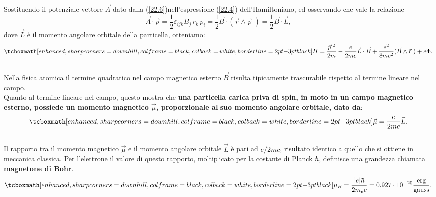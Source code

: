 Sostituendo il potenziale vettore $\vec{A}$ dato dalla (\ref{22.6})nell'espressione (\ref{22.4}) dell'Hamiltoniano, ed osservando che vale la relazione
\begin{equation}
\vec{A}\cdot\vec{p}=\frac{1}{2}\varepsilon_{ijk}B_{j}\, r_{k}\, p_{i}=\frac{1}{2}\vec{B}\cdot(\vec{r}\wedge\vec{p}\;)=\frac{1}{2}\vec{B}\cdot\vec{L} ,
\end{equation}
dove $\vec{L}$ è il momento angolare orbitale della particella, otteniamo:
	\begin{equation}
		\tcboxmath[enhanced, sharp corners=downhill, colframe=black, colback=white, borderline={2pt}{-3pt}{black}]{
			H=\frac{\vec{p}^{\;2}}{2m}-\frac{e}{2mc}\vec{L}\cdot\vec{B}+\frac{e^{2}}{8mc^{2}}(\vec{B}\wedge\vec{r}\;)+e\Phi .
			}
	\label{22.10}
	\end{equation}\\
	
Nella fisica atomica il termine quadratico nel campo magnetico esterno $\vec{B}$ risulta tipicamente trascurabile rispetto al termine lineare nel campo.\\

Quanto al termine lineare nel campo, questo mostra che \textbf{una particella carica priva di spin, in moto in un campo magnetico esterno, possiede un momento magnetico $\vec{\mu}$, proporzionale al suo momento angolare orbitale, dato da}:
	\begin{equation}
		\tcboxmath[enhanced, sharp corners=downhill, colframe=black, colback=white, borderline={2pt}{-3pt}{black}]{
			\vec{\mu}=\frac{e}{2mc}\vec{L} .
			}
	\label{22.11}
	\end{equation}\\
	
Il rapporto tra il momento magnetico $\vec{\mu}$ e il momento angolare orbitale $\vec{L}$ è pari ad $e/2mc$, risultato identico a quello che si ottiene in meccanica classica. Per l'elettrone il valore di questo rapporto, moltiplicato per la costante di Planck $\hbar$, definisce una grandezza chiamata \textbf{magnetone di Bohr}.
	\begin{equation}
		\tcboxmath[enhanced, sharp corners=downhill, colframe=black, colback=white, borderline={2pt}{-3pt}{black}]{
			\mu_{B}=\frac{|e|\hbar}{2m_{e}c}=0.927\cdot10^{-20}\frac{\textrm{erg}}{\textrm{gauss}} .
			}
	\end{equation}\\
	
